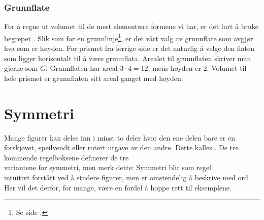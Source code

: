 \subsubsection{Grunnflate}
For å regne ut volumet til de mest elementære formene vi har, er det lurt å bruke begrepet . Slik som for en grunnlinje\footnote{Se side \pageref{grunnlinje}.}, er det vårt valg av grunnflate som avgjør hva som er høyden. For prismet fra forrige side er det naturlig å velge den flaten som ligger horisontalt til å være grunnflata. Arealet til grunnflaten skriver man gjerne som $ G $:
Grunnflaten har areal $ 3\cdot4=12 $, mens høyden er 2. Volumet til hele prismet er grunnflaten sitt areal ganget med høyden:
 \regv


\section{Symmetri}
Mange figurer kan deles inn i minst to deler hvor den ene delen bare er en forskjøvet, speilvendt eller rotert utgave av den andre. Dette kalles . De tre kommende regelboksene definerer de tre\\ variantene for symmetri, men merk dette: Symmetri blir som regel\\ intuitivt forstått ved å studere figurer, men er omstendelig å beskrive med ord. Her vil det derfor, for mange, være en fordel å hoppe rett til eksemplene.

